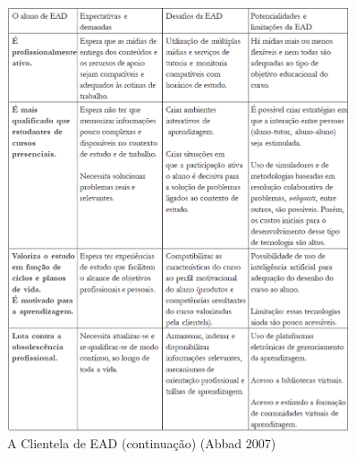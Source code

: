   

\begin{figure}
            \begin{center}
                \includegraphics[width=0.9\textwidth]{Tabela_EAD_2_Abbad_2007.png}
            \end{center}
            \caption{A Clientela de EAD (continuação) (Abbad 2007\cite{Abbad_2007})}
            \label{fig:Clientella_EAD_1}
\end{figure}

